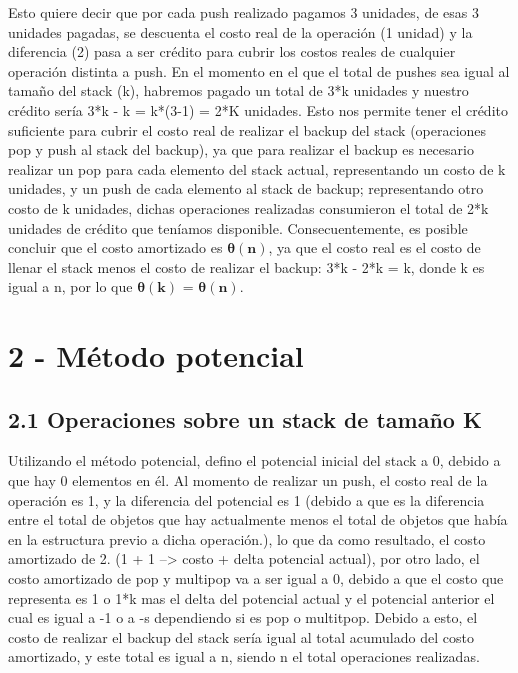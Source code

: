 \documentclass[10pt, letter]{report}
\begin{document}
Esto quiere decir que por cada push realizado pagamos 3 unidades, de esas 3 unidades pagadas, se descuenta el costo real de la operación (1 unidad) y la diferencia (2) pasa a ser crédito para cubrir los costos reales de cualquier operación distinta a push. En el momento en el que el total de pushes sea igual al tamaño del stack (k), habremos pagado un total de 3*k unidades y nuestro crédito sería 3*k - k = k*(3-1) = 2*K unidades. Esto nos permite tener el crédito suficiente para cubrir el costo real de realizar el backup del stack (operaciones pop y push al stack del backup), ya que para realizar el backup es necesario realizar un pop para cada elemento del stack actual, representando un costo de k unidades, y un push de cada elemento al stack de backup; representando otro costo de k unidades, dichas operaciones realizadas consumieron el total de 2*k unidades de crédito que teníamos disponible. Consecuentemente, es posible concluir que el costo amortizado es $\mathbf{\theta(n)}$, ya que el costo real es el costo de llenar el stack menos el costo de realizar el backup: 3*k - 2*k = k, donde k es igual a n, por lo que $\mathbf{\theta(k)}$ = $\mathbf{\theta(n)}$.
\section*{2 - Método potencial}
\subsection*{2.1 Operaciones sobre un stack de tamaño K}
Utilizando el método potencial, defino el potencial inicial del stack a 0, debido a que hay 0 elementos en él. Al momento de realizar un push, el costo real de la operación es 1, y la diferencia del potencial es 1 (debido a que es la diferencia entre el total de objetos que hay actualmente menos el total de objetos que había en la estructura previo a dicha operación.), lo que da como resultado, el costo amortizado de 2. (1 + 1 --> costo + delta potencial actual), por otro lado, el costo amortizado de pop y multipop va a ser igual a 0, debido a que el costo que representa es 1 o 1*k mas el delta del potencial actual y el potencial anterior el cual es igual a -1 o a -s dependiendo si es pop o multitpop. Debido a esto, el costo de realizar el backup del stack sería igual al total acumulado del costo amortizado, y este total es igual a n, siendo n el total operaciones realizadas.
~\\
\end{document}
